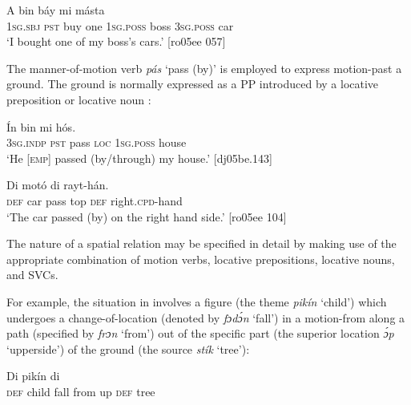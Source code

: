 \ea%
    \label{ex:key:985}
    \gll A    bin  báy   mi    másta  \\
\textsc{1sg.sbj}  \textsc{pst}  buy  one    \textsc{1sg.poss}  boss    \textsc{3sg.poss}  car\\

\glt ‘I bought one of my boss’s cars.’ [ro05ee 057]
\z

The manner-of-motion verb \textit{pás} ‘pass (by)’ is employed to express motion-past a ground. The ground is normally expressed as a PP introduced by a locative preposition  or locative noun : 


\ea%
    \label{ex:key:986}
    \gll \'{I}n    bin     mi    hós.\\
\textsc{3sg.indp}  \textsc{pst}  pass  \textsc{loc}  \textsc{1sg.poss}  house\\
\glt ‘He [\textsc{emp}] passed (by/through) my house.’ [dj05be.143]
\z

\ea%
    \label{ex:key:987}
    \gll Di  motó      di  rayt-hán.\\
\textsc{def}  car    pass  top    \textsc{def}  right.\textsc{cpd}{}-hand\\

\glt ‘The car passed (by) on the right hand side.’ [ro05ee 104]
\z

The nature of a spatial relation may be specified in detail by making use of the appropriate combination of motion verbs, locative prepositions, locative nouns, and SVCs.


For example, the situation in  involves a figure (the theme \textit{pikín} ‘child’) which undergoes a change-of-location (denoted by \textit{fɔdɔ́n} ‘fall’) in a motion-from along a path (specified by \textit{frɔn} ‘from’) out of the specific part (the superior location \textit{ɔ́p} ‘upperside’) of the ground (the source \textit{stík} ‘tree’):



\ea%
    \label{ex:key:988}
    \gll Di  pikín          di  \\
\textsc{def}  child  fall    from  up  \textsc{def}  tree\\

